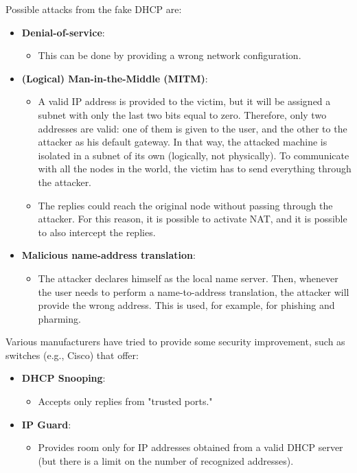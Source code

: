 Possible attacks from the fake DHCP are:

\begin{itemize}
	\item \textbf{Denial-of-service}:
	      \begin{itemize}
		      \item This can be done by providing a wrong network configuration.
	      \end{itemize}

	\item \textbf{(Logical) Man-in-the-Middle (MITM)}:
	      \begin{itemize}
		      \item A valid IP address is provided to the victim, but it will be assigned a subnet with only the last two bits equal to zero. Therefore, only two addresses are valid: one of them is given to the user, and the other to the attacker as his default gateway. In that way, the attacked machine is isolated in a subnet of its own (logically, not physically). To communicate with all the nodes in the world, the victim has to send everything through the attacker.
		      \item The replies could reach the original node without passing through the attacker. For this reason, it is possible to activate NAT, and it is possible to also intercept the replies.
	      \end{itemize}

	\item \textbf{Malicious name-address translation}:
	      \begin{itemize}
		      \item The attacker declares himself as the local name server. Then, whenever the user needs to perform a name-to-address translation, the attacker will provide the wrong address. This is used, for example, for phishing and pharming.
	      \end{itemize}
\end{itemize}

Various manufacturers have tried to provide some security improvement, such as switches (e.g., Cisco) that offer:

\begin{itemize}
	\item \textbf{DHCP Snooping}:
	      \begin{itemize}
		      \item Accepts only replies from "trusted ports."
	      \end{itemize}

	\item \textbf{IP Guard}:
	      \begin{itemize}
		      \item Provides room only for IP addresses obtained from a valid DHCP server (but there is a limit on the number of recognized addresses).
	      \end{itemize}
\end{itemize}

